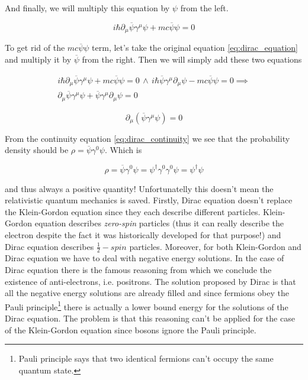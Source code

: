And finally, we will multiply this equation by $\psi$ from the left.

\begin{equation}
    i \hbar \partial_{\mu} \overline{\psi} \gamma^{\mu} \psi + mc \overline{\psi} \psi = 0
\end{equation}

To get rid of the $mc \overline{\psi} \psi$ term, let's take the original equation \ref{eq:dirac_equation} and multiply it
by $\overline{\psi}$ from the right. Then we will simply add these two equations

\begin{equation*}
    \begin{gathered}
        i \hbar \partial_{\mu} \overline{\psi} \gamma^{\mu} \psi + mc \overline{\psi} \psi = 0 \, \land \,
        i \hbar \overline{\psi} \gamma^{\mu} \partial_{\mu} \psi - mc \overline{\psi} \psi = 0 \implies \\
        \partial_{\mu} \overline{\psi} \gamma^{\mu} \psi + \overline{\psi} \gamma^{\mu} \partial_{\mu} \psi = 0
    \end{gathered}
\end{equation*}

\begin{equation}
    \label{eq:dirac_continuity}
    \partial_{\mu} (\overline{\psi} \gamma^{\mu} \psi) = 0
\end{equation}

From the continuity equation \ref{eq:dirac_continuity} we see that the probability density should be $\rho = \overline{\psi} \gamma^{0} \psi$.
Which is

\begin{equation*}
    \rho = \overline{\psi} \gamma^{0} \psi = \psi^{\dagger} \gamma^{0} \gamma^{0} \psi = \psi^{\dagger} \psi
\end{equation*}

and thus always a positive quantity! Unfortunatelly this doesn't mean the relativistic quantum mechanics is saved.
Firstly, Dirac equation doesn't replace the Klein-Gordon equation since they each describe different particles. Klein-Gordon
equation describes \textit{zero-spin} particles (thus it can really describe the electron despite the fact it was
historically developed for that purpose!) and Dirac equation describes $\frac{1}{2}-spin$ particles. Moreover, for 
both Klein-Gordon and Dirac equation we have to deal with negative energy solutions. In the case of Dirac equation
there is the famous reasoning from which we conclude the existence of anti-electrons, i.e. positrons. The solution
proposed by Dirac is that all the negative energy solutions are already filled and since fermions obey the Pauli 
principle\footnote{Pauli principle says that two identical fermions can't occupy the same quantum state.} there
is actually a lower bound energy for the solutions of the Dirac equation. The problem is that this reasoning can't
be applied for the case of the Klein-Gordon equation since bosons ignore the Pauli principle.

